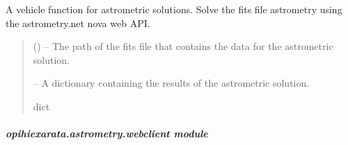 \documentclass[letterpaper,11pt,english]{sphinxmanual}
\begin{document}

\begin{savenotes}\begin{fulllineitems}
\label{\detokenize{code/opihiexarata.astrometry.solution:opihiexarata.astrometry.solution._vehicle_astrometrynet_web_api}}
\pysigstartsignatures
{}
\pysigstopsignatures
\sphinxAtStartPar
A vehicle function for astrometric solutions. Solve the fits file
astrometry using the astrometry.net nova web API.
\begin{quote}\begin{description}
\sphinxAtStartPar
{} () – The path of the fits file that contains the data for the astrometric
solution.

\sphinxAtStartPar
{} – A dictionary containing the results of the astrometric solution.

\sphinxAtStartPar
dict

\end{description}\end{quote}

\end{fulllineitems}\end{savenotes}


\sphinxstepscope


\subparagraph{opihiexarata.astrometry.webclient module}
\label{\detokenize{code/opihiexarata.astrometry.webclient:module-opihiexarata.astrometry.webclient}}\label{\detokenize{code/opihiexarata.astrometry.webclient:opihiexarata-astrometry-webclient-module}}\label{\detokenize{code/opihiexarata.astrometry.webclient::doc}}
\end{document}
